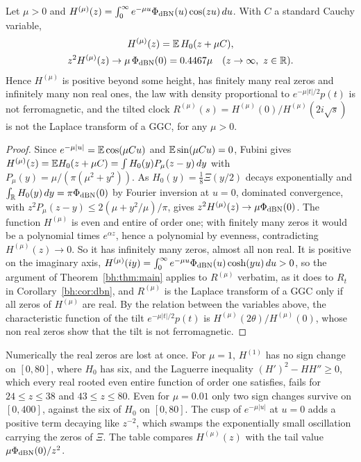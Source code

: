 \begin{theorem}\label{xg:thm:cauchy}
Let $\mu>0$ and $H^{(\mu)}(z)=\int_0^\infty e^{-\mu u}\Phi_{\rm dBN}(u)\cos(zu)\,du$. With $C$ a standard Cauchy variable,
\begin{gather*}
H^{(\mu)}(z)=\E\,H_0(z+\mu C),\\
z^2H^{(\mu)}(z)\to\mu\,\Phi_{\rm dBN}(0)=0.4467\mu\quad(z\to\infty,\ z\in\R).
\end{gather*}
Hence $H^{(\mu)}$ is positive beyond some height, has finitely many real zeros and infinitely many non real ones, the law with density proportional to $e^{-\mu|t|/2}p(t)$ is not ferromagnetic, and the tilted clock $R^{(\mu)}(s)=H^{(\mu)}(0)/H^{(\mu)}(2i\sqrt s)$ is not the Laplace transform of a GGC, for any $\mu>0$.
\end{theorem}

\begin{proof}
Since $e^{-\mu|u|}=\mathbb{E}\cos(\mu Cu)$ and $\mathbb{E}\sin(\mu Cu)=0$, Fubini gives $H^{(\mu)}(z)=\mathbb{E} H_0(z+\mu C)=\int H_0(y)P_\mu(z-y)\,dy$ with $P_\mu(y)=\mu/(\pi(\mu^2+y^2))$. As $H_0(y)=\frac18\Xi(y/2)$ decays exponentially and $\int_{\mathbb{R}}H_0(y)\,dy=\pi\Phi_{\rm dBN}(0)$ by Fourier inversion at $u=0$, dominated convergence, with $z^2P_\mu(z-y)\le2(\mu+y^2/\mu)/\pi$, gives $z^2H^{(\mu)}(z)\to\mu\Phi_{\rm dBN}(0)$. The function $H^{(\mu)}$ is even and entire of order one; with finitely many zeros it would be a polynomial times $e^{\alpha z}$, hence a polynomial by evenness, contradicting $H^{(\mu)}(z)\to0$. So it has infinitely many zeros, almost all non real. It is positive on the imaginary axis, $H^{(\mu)}(iy)=\int_0^\infty e^{-\mu u}\Phi_{\rm dBN}(u)\cosh(yu)\,du>0$, so the argument of Theorem~\ref{bh:thm:main} applies to $R^{(\mu)}$ verbatim, as it does to $R_t$ in Corollary~\ref{bh:cor:dbn}, and $R^{(\mu)}$ is the Laplace transform of a GGC only if all zeros of $H^{(\mu)}$ are real. By the relation between the variables above, the characteristic function of the tilt $e^{-\mu|t|/2}p(t)$ is $H^{(\mu)}(2\theta)/H^{(\mu)}(0)$, whose non real zeros show that the tilt is not ferromagnetic.
\end{proof}

Numerically the real zeros are lost at once. For $\mu=1$, $H^{(1)}$ has no sign change on $[0,80]$, where $H_0$ has six, and the Laguerre inequality $(H')^2-HH''\ge0$, which every real rooted even entire function of order one satisfies, fails for $24\le z\le38$ and $43\le z\le80$. Even for $\mu=0.01$ only two sign changes survive on $[0,400]$, against the six of $H_0$ on $[0,80]$. The cusp of $e^{-\mu|u|}$ at $u=0$ adds a positive term decaying like $z^{-2}$, which swamps the exponentially small oscillation carrying the zeros of $\Xi$. The table compares $H^{(\mu)}(z)$ with the tail value $\mu\Phi_{\rm dBN}(0)/z^2$.

